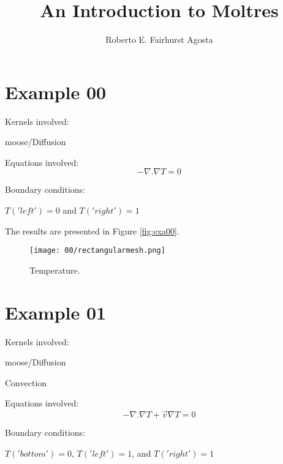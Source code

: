 \documentclass[11pt,letterpaper]{article}
\title{An Introduction to Moltres}
\author{Roberto E. Fairhurst Agosta}
\begin{document}
	\begin{titlepage}
		\maketitle
		\thispagestyle{empty}
	\end{titlepage}
	
\section{Example 00}

Kernels involved:
\begin{description}[font=$\bullet$\scshape\bfseries]
	\item[] moose/Diffusion
\end{description}

Equations involved:
\begin{equation}
-\nabla.\nabla T=0
\end{equation}

Boundary conditions:
\begin{description}[]
	\item[] $T('left')=0$ and $T('right')=1$
\end{description}

The results are presented in Figure \ref{fig:exa00}.
\begin{figure*}[!h]
	\centering
	\texttt{[image: 00/rectangularmesh.png]} 
	\hfill
	\caption{Temperature.}
	\label{fig:ex00}
\end{figure*}

\newpage
\section{Example 01}

Kernels involved:
\begin{description}[font=$\bullet$\scshape\bfseries]
	\item[] moose/Diffusion
	\item[] Convection
\end{description}

Equations involved:
\begin{equation}
-\nabla.\nabla T + \vec{v}\nabla T=0
\end{equation}

Boundary conditions:
\begin{description}[]
	\item[] $T('bottom')=0$, $T('left')=1$, and $T('right')=1$
\end{description}
\end{document}

